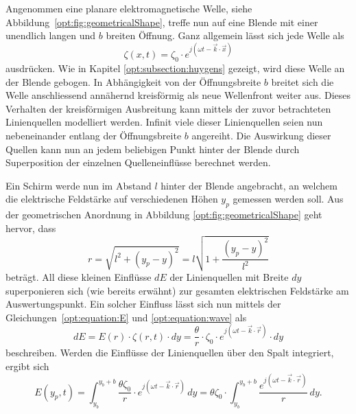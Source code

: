 Angenommen eine planare elektromagnetische Welle, siehe Abbildung~\ref{opt:fig:geometricalShape}, treffe nun auf eine Blende mit einer unendlich langen und $b$ breiten Öffnung.
Ganz allgemein lässt sich jede Welle als
\begin{equation}
\zeta(x, t)
=
\zeta_0 \cdot e^{j(\omega t - \vec{k}\cdot\vec{x})}
\label{opt:equation:wave}
\end{equation}
ausdrücken.
Wie in Kapitel \ref{opt:subsection:huygens} gezeigt, wird diese Welle an der Blende gebogen.
In Abhängigkeit von der Öffnungsbreite $b$ breitet sich die Welle anschliessend annähernd kreisförmig als neue Wellenfront weiter aus.
Dieses Verhalten der kreisförmigen Ausbreitung kann mittels der zuvor betrachteten Linienquellen modelliert werden.
Infinit viele dieser Linienquellen seien nun nebeneinander entlang der Öffnungsbreite $b$ angereiht.
Die Auswirkung dieser Quellen kann nun an jedem beliebigen Punkt hinter der Blende durch Superposition der einzelnen Quelleneinflüsse berechnet werden.

Ein Schirm werde nun im Abstand $l$ hinter der Blende angebracht, an welchem die elektrische Feldstärke auf verschiedenen Höhen $y_p$ gemessen werden soll.
Aus der geometrischen Anordnung in Abbildung \ref{opt:fig:geometricalShape} geht hervor, dass
\begin{equation}
r
=
\sqrt{l^2 + (y_p-y)^2}
=
l \sqrt{1 + \frac{(y_p-y)^2}{l^2}}
\label{opt:equation:distance_r}
\end{equation}
beträgt. All diese kleinen Einflüsse $dE$ der Linienquellen mit Breite $dy$ superponieren sich (wie bereits erwähnt) zur gesamten elektrischen Feldstärke am Auswertungspunkt.
Ein solcher Einfluss lässt sich nun mittels der Gleichungen~\ref{opt:equation:E} und \ref{opt:equation:wave} als
\begin{equation}
dE
=
E(r) \cdot \zeta(r, t) \cdot dy
=
\frac{\theta}{r} \cdot \zeta_0 \cdot e^{j(\omega t - \vec{k}\cdot\vec{r})} \cdot dy
\end{equation}
beschreiben.
Werden die Einflüsse der Linienquellen über den Spalt integriert, ergibt sich
\begin{equation}
E(y_p, t)
=
\int_{y_b}^{y_b+b}\frac{\theta\zeta_0}{r} \cdot e^{j(\omega t - \vec{k}\cdot\vec{r})} \,dy
=
\theta\zeta_0 \cdot \int_{y_b}^{y_b+b}\frac{e^{j(\omega t - \vec{k}\cdot\vec{r})}}{r} \,dy
.
\end{equation}

